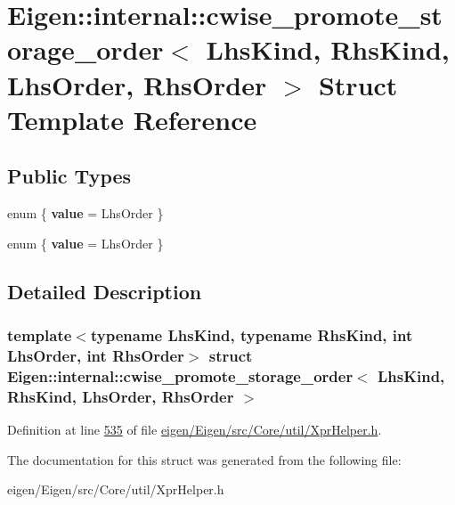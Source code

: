 \hypertarget{struct_eigen_1_1internal_1_1cwise__promote__storage__order}{}\section{Eigen\+:\+:internal\+:\+:cwise\+\_\+promote\+\_\+storage\+\_\+order$<$ Lhs\+Kind, Rhs\+Kind, Lhs\+Order, Rhs\+Order $>$ Struct Template Reference}
\label{struct_eigen_1_1internal_1_1cwise__promote__storage__order}
\subsection*{Public Types}
\begin{DoxyCompactItemize}
\item 
\mbox{\label{struct_eigen_1_1internal_1_1cwise__promote__storage__order_a1f70b1aa7d6bdcec7f7390c1e3fad0ce}} 
enum \{ {\bfseries value} = Lhs\+Order
 \}
\item 
\mbox{\label{struct_eigen_1_1internal_1_1cwise__promote__storage__order_aa5e269d220b9855fe4819907fde97124}} 
enum \{ {\bfseries value} = Lhs\+Order
 \}
\end{DoxyCompactItemize}


\subsection{Detailed Description}
\subsubsection*{template$<$typename Lhs\+Kind, typename Rhs\+Kind, int Lhs\+Order, int Rhs\+Order$>$\newline
struct Eigen\+::internal\+::cwise\+\_\+promote\+\_\+storage\+\_\+order$<$ Lhs\+Kind, Rhs\+Kind, Lhs\+Order, Rhs\+Order $>$}



Definition at line \hyperlink{eigen_2_eigen_2src_2_core_2util_2_xpr_helper_8h_source_l00535}{535} of file \hyperlink{eigen_2_eigen_2src_2_core_2util_2_xpr_helper_8h_source}{eigen/\+Eigen/src/\+Core/util/\+Xpr\+Helper.\+h}.



The documentation for this struct was generated from the following file\+:\begin{DoxyCompactItemize}
\item 
eigen/\+Eigen/src/\+Core/util/\+Xpr\+Helper.\+h\end{DoxyCompactItemize}
